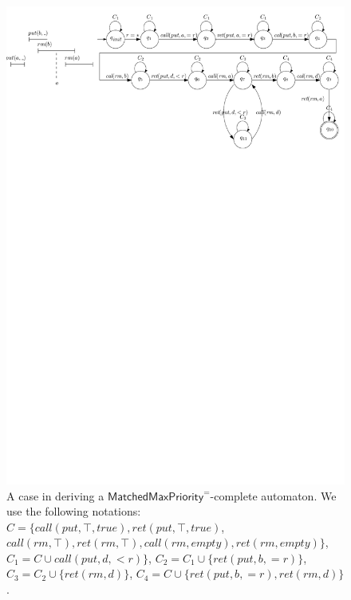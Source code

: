 \begin{figure}[htbp]
  \centering
  \includegraphics[width=0.8 \textwidth]{figures/PIC-Enumeration-WitnessAutomata.pdf}
  \caption{A case in deriving a $\mathsf{MatchedMaxPriority}^{=}$-complete automaton. We use the following notations: $C = \{ \textit{call}(\textit{put},\top,\textit{true}),\textit{ret}(\textit{put},\top,\textit{true})$, $\textit{call}(\textit{rm},\top), \textit{ret}(\textit{rm},\top),\textit{call}(\textit{rm},\textit{empty}),\textit{ret}(\textit{rm},\textit{empty}) \}$, $C_1 = C \cup \textit{call}(\textit{put},d,<r) \}$, $C_2 = C_1 \cup \{ \textit{ret}(\textit{put},b,=r) \}$, $C_3 = C_2 \cup \{ \textit{ret}(\textit{rm},d) \}$, $C_4 = C \cup \{ \textit{ret}(\textit{put},b,=r), \textit{ret}(\textit{rm},d) \}$.}
  \label{fig:an enumeration and its witness automaton}
\end{figure}



